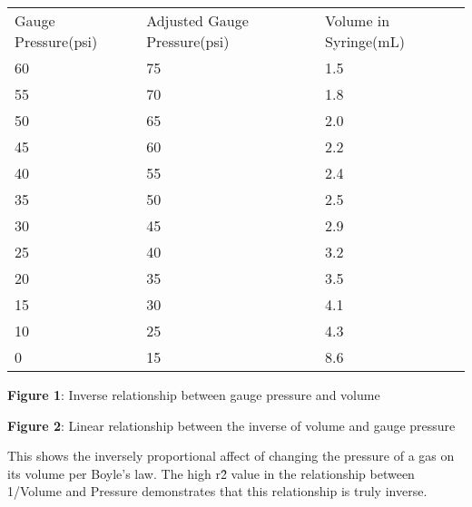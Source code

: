 \documentclass{article}
\begin{document}
\begin{minipage}{0.4\textwidth}
\begin{table}[H]
    \begin{tabularx}{400pt}{p{2cm}|p{2cm}|p{2cm}} Gauge Pressure(psi) & Adjusted Gauge Pressure(psi) & Volume in Syringe(mL) \\
    60 & 75 & 1.5 \\
    55 & 70 & 1.8 \\
    50 & 65 & 2.0 \\
    45 & 60 & 2.2 \\
    40 & 55 & 2.4 \\
    35 & 50 & 2.5 \\
    30 & 45 & 2.9 \\
    25 & 40 & 3.2 \\
    20 & 35 & 3.5 \\
    15 & 30 & 4.1 \\
    10 & 25 & 4.3 \\
    0 & 15 & 8.6 
    
    \end{tabularx}
\end{table}
\end{minipage}
\hfill
\begin{minipage}{0.5\textwidth}

\end{minipage}
\centering
\textbf{Figure 1}: Inverse relationship between gauge pressure and volume
$\ $

\textbf{Figure 2}: Linear relationship between the inverse of volume and gauge pressure

This shows the inversely proportional affect of changing the pressure of a gas on its volume per Boyle's law. The high r\^2 value in the relationship between 1/Volume and Pressure demonstrates that this relationship is truly inverse.
\end{document}
